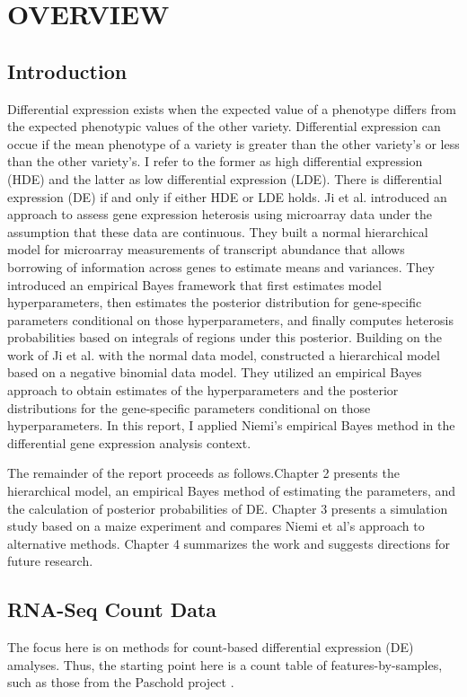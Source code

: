 \chapter{OVERVIEW}



\section{Introduction}

Differential expression exists when the expected value of a phenotype differs from the expected phenotypic values of the other variety. Differential expression can occue if the mean phenotype of a variety is greater than the other variety's or less than the other variety's. I refer to the former as high differential expression (HDE) and the latter as low differential expression (LDE). There is differential expression (DE) if and only if either HDE or LDE holds. Ji et al. \cite{ji2014estimation} introduced an approach to assess gene expression heterosis using microarray data under the assumption that these data are continuous. They built a normal hierarchical model for microarray measurements of transcript abundance that allows borrowing of information across genes to estimate means and variances. They introduced an empirical Bayes framework that first estimates model hyperparameters, then estimates the posterior distribution for gene-specific parameters conditional on those hyperparameters, and finally computes heterosis probabilities based on integrals of regions under this posterior. Building on the work of Ji et al. with the normal data model, \cite{niemi2015empirical} constructed a hierarchical model based on a negative binomial data model. They utilized an empirical Bayes approach to obtain estimates of the hyperparameters and the posterior distributions for the gene-specific parameters conditional on those hyperparameters. In this report, I applied Niemi's empirical Bayes method in the differential gene expression analysis context. 


The remainder of the report proceeds as follows.Chapter 2 presents the hierarchical model, an empirical Bayes method of estimating the parameters, and the calculation of posterior probabilities of DE. Chapter 3 presents a simulation study based on a maize experiment and compares Niemi et al's approach to alternative methods. Chapter 4 summarizes the work and suggests directions for future research.


\section{RNA-Seq Count Data}
The focus here is on methods for count-based differential expression (DE) amalyses. Thus, the starting point here is a count table of features-by-samples, such as those from the Paschold project \cite{paschold2012complementation}.

